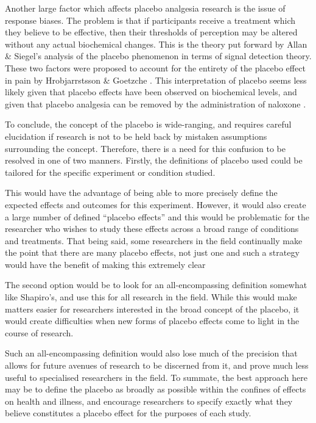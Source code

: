 Another large factor which affects placebo analgesia research is the issue of response biases. The problem is that if participants receive a treatment which they believe to be effective, then their thresholds of perception may be altered without any actual biochemical changes. This is the theory put forward by Allan \& Siegel's \cite{Allan2002} analysis of the placebo phenomenon in terms of signal detection theory. These two factors were proposed to account for the entirety of the placebo effect in pain by Hrobjarrstsson \& Goetzche \cite{HrAbjartsson2001}. This interpretation of placebo seems less likely given that placebo effects have been observed on biochemical levels, and given that placebo analgesia can be removed by the administration of naloxone \cite{Levine1979} \cite{Benedetti2003}. 



To conclude, the concept of the placebo is wide-ranging, and requires careful elucidation if research is not to be held back by mistaken assumptions surrounding the concept. Therefore, there is a need for this confusion to be resolved in one of two manners. Firstly, the definitions of placebo used could be tailored for the specific experiment or condition studied. 

This would have the advantage of being able to more precisely define the expected effects and outcomes for this experiment. However, it would also create a large number of defined ``placebo effects'' and this would be problematic for the researcher who wishes to study these effects across a broad range of conditions and treatments. That being said, some researchers in the field continually make the point that there are many placebo effects, not just one and such a strategy would have the benefit of making this extremely clear \cite{Benedetti2008} 

The second option would be to look for an all-encompassing definition somewhat like Shapiro's, and use this for all research in the field. While this would make matters easier for researchers interested in the broad concept of the placebo, it would create difficulties when new forms of placebo effects come to light in the course of research. 

Such an all-encompassing definition would also lose much of the precision that allows for future avenues of research to be discerned from it, and prove much less useful to specialised researchers in the field. To summate, the best approach here may be to define the placebo as broadly as possible within the confines of effects on health and illness, and encourage researchers to specify exactly what they believe constitutes a placebo effect for the purposes of each study.

